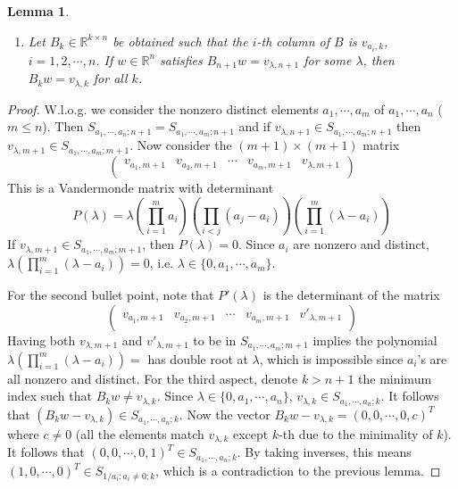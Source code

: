 \documentclass[11pt,a4paper]{article}
\newcommand{\<}{\langle}
\renewcommand{\>}{\rangle}
\newtheorem{lemma}{Lemma}
\begin{document}
\begin{enumerate}
\begin{lemma}
\begin{enumerate}
    		\item 
    		Let $B_k\in\mathbb{R}^{k\times n}$ be obtained such that 
    		the $i$-th column of $B$ is $v_{a_i, k}$, $i=1, 2, \cdots, n$. 
    		If $w\in \mathbb{R}^n$ satisfies $B_{n+1}w = v_{\lambda, n + 1}$ for some $\lambda$, 
    		then  $B_{k}w = v_{\lambda, k}$ for all $k$. 
    	\end{enumerate}

    \end{lemma}

    \begin{proof}
    	W.l.o.g. we consider the nonzero distinct elements $a_1, \cdots, a_m$ of $a_1, \cdots, a_n$ ($m\le n$). 
    	Then $S_{a_1, \cdots, a_n; n + 1}=S_{a_1, \cdots, a_m; n + 1}$ and 
    	if $v_{\lambda, n + 1}\in S_{a_1, \cdots, a_m; n + 1}$ then $v_{\lambda, m + 1}\in S_{a_1, \cdots, a_m; m + 1}$. 
    	Now consider the $(m + 1)\times (m + 1)$ matrix 
    	\[
    	\begin{pmatrix}
    		v_{a_1, m+1} & v_{a_2, m+1} & \cdots & v_{a_m, m+1} & v_{\lambda, m+1}\\
    	\end{pmatrix}
    	\]
    	This is a Vandermonde matrix with determinant 
    	\[
    	P(\lambda)=\lambda\left(\prod_{i=1}^m a_i\right)\left(\prod_{i < j}(a_j-a_i)\right)\left(\prod_{i=1}^m (\lambda - a_i)\right)
    	\]
    	If $v_{\lambda, m+1}\in S_{a_1, \cdots, a_m; m + 1}$, then 
    	$P(\lambda) = 0$. 
    	Since $a_i$ are nonzero and distinct, $\lambda\left(\prod_{i=1}^m (\lambda - a_i)\right)=0$, 
    	i.e. $\lambda \in \{0, a_1, \cdots, a_m\}$. 
    	
    	For the second bullet point, note that $P'(\lambda)$ is the determinant of the matrix 
    	\[
    	\begin{pmatrix}
    		v_{a_1, m+1} & v_{a_2, m+1} & \cdots & v_{a_m, m+1} & v'_{\lambda, m+1}\\
    	\end{pmatrix}
    	\]
    	Having both $v_{\lambda, m+1}$ and $v'_{\lambda, m + 1}$ to be in $S_{a_1, \cdots, a_m; m + 1}$ implies the polynomial $\lambda\left(\prod_{i=1}^m (\lambda - a_i)\right)=$ has double root at $\lambda$, 
    	which is impossible since $a_i$'s are all nonzero and distinct. 
    	For the third aspect, denote $k > n + 1$ the minimum index such that 
    	$B_kw\neq v_{\lambda, k}$. 
    	Since $\lambda\in \{0, a_1, \cdots, a_n\}$, $v_{\lambda, k}\in S_{a_1, \cdots, a_n; k}$. 
    	It follows that $(B_kw - v_{\lambda, k})\in S_{a_1, \cdots, a_n; k}$. 
    	Now the vector $B_kw - v_{\lambda, k} = (0, 0, \cdots, 0, c)^T$ where $c\neq 0$ 
    	(all the elements match $v_{\lambda, k}$ except $k$-th due to the minimality of $k$). 
    	It follows that $(0, 0, \cdots, 0, 1)^T\in S_{a_1, \cdots, a_n; k}$. 
    	By taking inverses, this means $(1, 0, \cdots, 0)^T\in S_{1/a_i: a_i\neq 0; k}$, which is a contradiction to the previous lemma. 
    \end{proof}
    


\end{enumerate}
\end{document}
